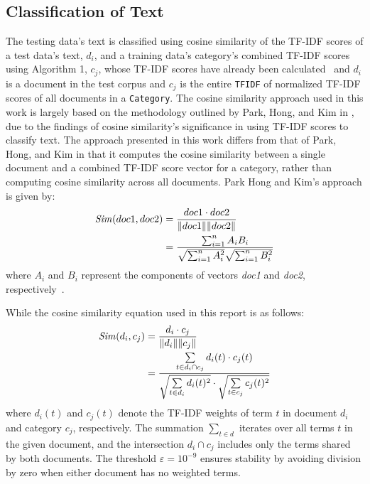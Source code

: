 \documentclass[conference]{IEEEtran}
\newcommand{\code}[1]{\lstinline[basicstyle=\ttfamily]|#1|}
\begin{document}
\subsection{Classification of Text}
The testing data's text is classified using cosine similarity of the TF-IDF scores of a test data's text, $d_i$, and a training data's category's combined TF-IDF scores using Algorithm 1, $c_j$, whose TF-IDF scores have already been calculated~\cite{b1} and $d_i$ is a document in the test corpus and $c_j$ is the entire \code{TFIDF} of normalized TF-IDF scores of all documents in a \code{Category}. The cosine similarity approach used in this work is largely based on the methodology outlined by Park, Hong, and Kim in \cite{b2}, due to the findings of cosine similarity's significance in using TF-IDF scores to classify text. The approach presented in this work differs from that of Park, Hong, and Kim in that it computes the cosine similarity between a single document and a combined TF-IDF score vector for a category, rather than computing cosine similarity across all documents. Park Hong and Kim's approach is given by:
\begin{equation}
\begin{aligned}    
\text{\textit{Sim}}(doc1, doc2) &= \frac{doc1 \cdot doc2}{\|doc1\| \|doc2\|} \\
                       &= \frac{\sum_{i=1}^{n} A_i B_i}{\sqrt{\sum_{i=1}^{n} A_i^2} \sqrt{\sum_{i=1}^{n} B_i^2}}
\end{aligned}
\end{equation}
where $A_i$ and $B_i$ represent the components of vectors \textit{doc1} and \textit{doc2}, respectively~\cite{b2}.

While the cosine similarity equation used in this report is as follows: 
\begin{equation}
\begin{aligned}
\text{\textit{Sim}}(d_i, c_j) &= \frac{d_i \cdot c_j}{\|d_i\| \|c_j\|} \\
                     &= \frac{ \sum\limits_{t \in d_i \cap c_j} d_i(t) \cdot c_j(t) }
        { \sqrt{ \sum\limits_{t \in d_i} d_i(t)^2 } \cdot \sqrt{ \sum\limits_{t \in c_j} c_j(t)^2 } } \label{eq:cosine-sim} \\
\end{aligned}
\end{equation}
where $d_i(t)$ and $c_j(t)$ denote the TF-IDF weights of term $t$ in document $d_i$ and category $c_j$, respectively. The summation $\sum_{t \in d}$ iterates over all terms $t$ in the given document, and the intersection $d_i \cap c_j$ includes only the terms shared by both documents. The threshold $\varepsilon = 10^{-9}$ ensures stability by avoiding division by zero when either document has no weighted terms.
\end{document}
